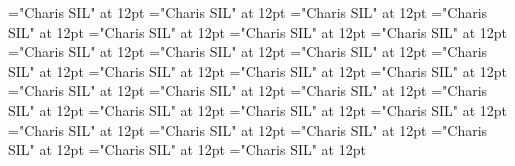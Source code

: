 \documentclass[a4paper]{article}
\begin{document}
\pagestyle{plain}
\sloppy
\setlength{\parfillskip}{0pt plus 1fil}
\font{}="Charis SIL" at 12pt
\font{}="Charis SIL" at 12pt
\font{}="Charis SIL" at 12pt
\font\entryletDatadicBody="Charis SIL" at 12pt
\font\headwordsehentryletDatadicBody="Charis SIL" at 12pt
\font\xhomographnumberptheadwordsehentryletDatadicBody="Charis SIL" at 12pt
\font\sensesentryletDatadicBody="Charis SIL" at 12pt
\font\sensesensesentryletDatadicBody="Charis SIL" at 12pt
\font\xsensenumberLcensensesensesentryletDatadicBody="Charis SIL" at 12pt
\font\grammaticalinfosensesensesentryletDatadicBody="Charis SIL" at 12pt
\font\partofspeechptgrammaticalinfosensesensesentryletDatadicBody="Charis SIL" at 12pt
\font\slotsgrammaticalinfosensesensesentryletDatadicBody="Charis SIL" at 12pt
\font\xitemslotsgrammaticalinfosensesensesentryletDatadicBody="Charis SIL" at 12pt
\font\slotnameptxitemslotsgrammaticalinfosensesensesentryletDatadicBody="Charis SIL" at 12pt
\font{}="Charis SIL" at 12pt
\font\xitemptdefinitionLbptsensesensesentryletDatadicBody="Charis SIL" at 12pt
\font\xlanguagetagenxitemptdefinitionLbptsensesensesentryletDatadicBody="Charis SIL" at 12pt
\font\xitemendefinitionLbptsensesensesentryletDatadicBody="Charis SIL" at 12pt
\font\xlanguagetagenxitemendefinitionLbptsensesensesentryletDatadicBody="Charis SIL" at 12pt
\font\slotnameptslotsgrammaticalinfosensesensesentryletDatadicBody="Charis SIL" at 12pt
\font\relationantonymptsensesensesentryletDatadicBody="Charis SIL" at 12pt
\font\relationantonymbeforesensesensesentryletDatadicBody="Charis SIL" at 12pt
\font\xitemptrelationantonymptsensesensesentryletDatadicBody="Charis SIL" at 12pt
\font\xlanguagetagenxitemptrelationantonymptsensesensesentryletDatadicBody="Charis SIL" at 12pt
\font\xitemenrelationantonymptsensesensesentryletDatadicBody="Charis SIL" at 12pt
\font\xlanguagetagenxitemenrelationantonymptsensesensesentryletDatadicBody="Charis SIL" at 12pt
\font\xsensenumberLbensensesensesentryletDatadicBody="Charis SIL" at 12pt

\newpage 
\thispagestyle{empty} 
\mbox{} 
\newpage 
\newpage 
\setcounter{page}{1} 
\pagestyle{fancy} 

\end{document}
